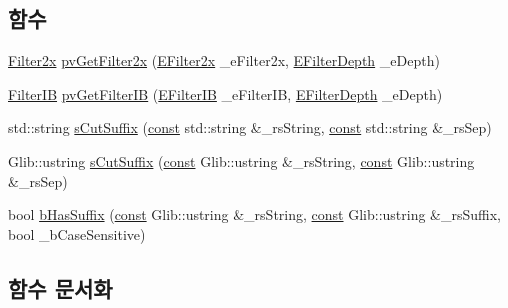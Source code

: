 \subsection*{함수}
\begin{DoxyCompactItemize}
\item 
\mbox{\hyperlink{class_v_b_a_accd36b6c101a516c50cf8288976739c4}{Filter2x}} \mbox{\hyperlink{namespace_v_b_a_a2a6c0188179e4ee017369e21d8e6f268}{pv\+Get\+Filter2x}} (\mbox{\hyperlink{class_v_b_a_a1683020d7324daf3bda627d0d3658e3e}{E\+Filter2x}} \+\_\+e\+Filter2x, \mbox{\hyperlink{class_v_b_a_a6ec41ea038b4ea42eb8d9ea59d3eb4c5}{E\+Filter\+Depth}} \+\_\+e\+Depth)
\item 
\mbox{\hyperlink{class_v_b_a_a3269ee707f37ad255f2b7b0f20921158}{Filter\+IB}} \mbox{\hyperlink{namespace_v_b_a_ad5980a2981a7b766dce52ebc49a987bb}{pv\+Get\+Filter\+IB}} (\mbox{\hyperlink{class_v_b_a_a304ffeb9f4a8b26e7fa4e2eb620d780f}{E\+Filter\+IB}} \+\_\+e\+Filter\+IB, \mbox{\hyperlink{class_v_b_a_a6ec41ea038b4ea42eb8d9ea59d3eb4c5}{E\+Filter\+Depth}} \+\_\+e\+Depth)
\item 
std\+::string \mbox{\hyperlink{namespace_v_b_a_ad362cd74dbe4234578a0a124f3522dcf}{s\+Cut\+Suffix}} (\mbox{\hyperlink{getopt1_8c_a2c212835823e3c54a8ab6d95c652660e}{const}} std\+::string \&\+\_\+rs\+String, \mbox{\hyperlink{getopt1_8c_a2c212835823e3c54a8ab6d95c652660e}{const}} std\+::string \&\+\_\+rs\+Sep)
\item 
Glib\+::ustring \mbox{\hyperlink{namespace_v_b_a_aa627086c3b36799bc10a36048e5c5b68}{s\+Cut\+Suffix}} (\mbox{\hyperlink{getopt1_8c_a2c212835823e3c54a8ab6d95c652660e}{const}} Glib\+::ustring \&\+\_\+rs\+String, \mbox{\hyperlink{getopt1_8c_a2c212835823e3c54a8ab6d95c652660e}{const}} Glib\+::ustring \&\+\_\+rs\+Sep)
\item 
bool \mbox{\hyperlink{namespace_v_b_a_ad93561fe4528e04192e066e138c3572b}{b\+Has\+Suffix}} (\mbox{\hyperlink{getopt1_8c_a2c212835823e3c54a8ab6d95c652660e}{const}} Glib\+::ustring \&\+\_\+rs\+String, \mbox{\hyperlink{getopt1_8c_a2c212835823e3c54a8ab6d95c652660e}{const}} Glib\+::ustring \&\+\_\+rs\+Suffix, bool \+\_\+b\+Case\+Sensitive)
\end{DoxyCompactItemize}


\subsection{함수 문서화}
\mbox{\label{namespace_v_b_a_ad93561fe4528e04192e066e138c3572b}} 
